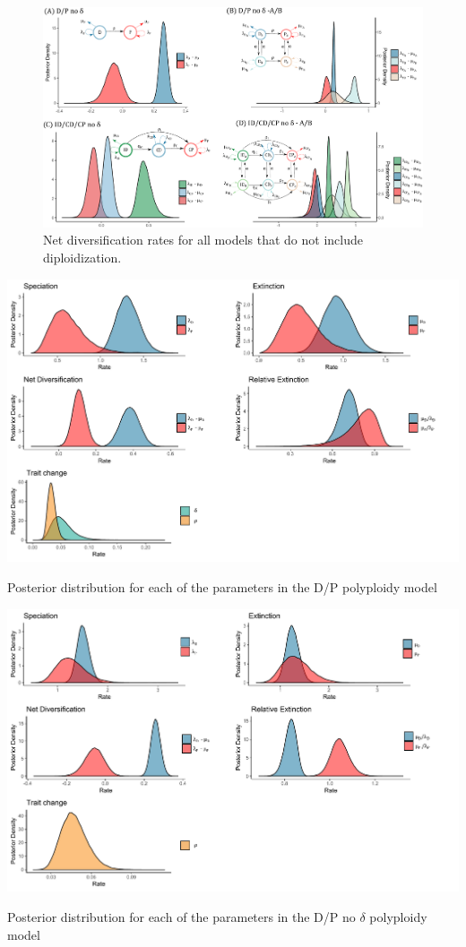 \begin{figure}
\includegraphics[width=\textwidth]{netdiversificationallnodip.pdf}
  \caption{Net diversification rates for all models that do not include diploidization.}  
\label{figure:netdivnodip}
\end{figure}

\begin{suppfigure}
\includegraphics[width=\textwidth]{bisseDPposteriordist.pdf}
\caption{Posterior distribution for each of the parameters in the D/P polyploidy model} %
\label{suppfigure:DP}
\end{suppfigure}

\begin{suppfigure}
\includegraphics[width=\textwidth]{bisseDPnodipposteriordist.pdf}
\caption{Posterior distribution for each of the parameters in the D/P no $\delta$ polyploidy model} %
\label{suppfigure:DPnodip}
\end{suppfigure}

